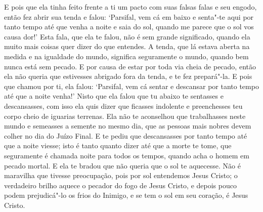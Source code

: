 E pois que ela tinha feito frente a ti um pacto com suas falsas falas e seu
engodo, então fez abrir sua tenda e falou: ‘Parsifal, vem cá em baixo e
senta"-te aqui por tanto tempo até que venha a noite e saia do sol, quando me
parece que o sol vos causa dor!’ Esta fala, que ela te falou, não é sem grande
significado, quando ela muito mais coisas quer dizer do que entendes. A tenda,
que lá estava aberta na medida e na igualdade do mundo, significa seguramente o
mundo, quando bem nunca está sem pecado. E por causa de estar por toda via
cheia de pecado, então ela não queria que estivesses abrigado fora da tenda, e
te fez prepará"-la. E pois que chamou por ti, ela falou: ‘Parsifal, vem cá
sentar e descansar por tanto tempo até que a noite venha!’ Nisto que ela
falou que tu abaixo te sentasses e descansasses, com isso ela quis dizer que
ficasses indolente e preenchesses teu corpo cheio de iguarias terrenas. Ela não
te aconselhou que trabalhasses neste mundo e semeasses a semente no mesmo dia,
que as pessoas mais nobres devem colher no dia do Juízo Final. E te pediu que
descansasses por tanto tempo até que a noite viesse; isto é tanto quanto dizer
até que a morte te tome, que seguramente é chamada noite para todos os tempos,
quando acha o homem em pecado mortal. E ela te bradou que não queria que o sol
te aquecesse. Não é maravilha que tivesse preocupação, pois por sol entendemos
Jesus Cristo; o verdadeiro brilho aquece o pecador do fogo de Jesus Cristo, e
depois pouco podem prejudicá"-lo os frios do Inimigo, e se tem o sol em seu
coração, é Jesus Cristo.  

